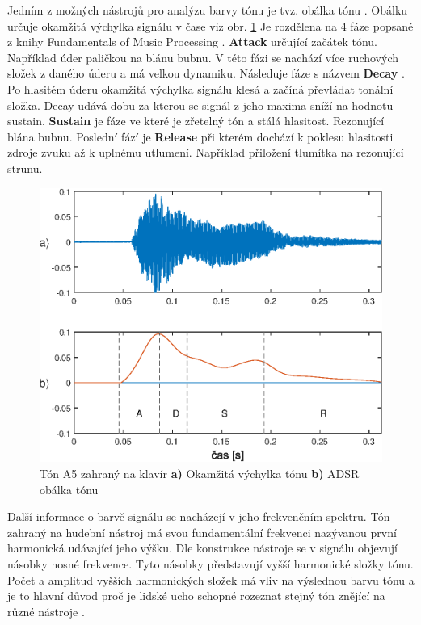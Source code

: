   Jedním z možných nástrojů pro analýzu barvy tónu je tvz. obálka tónu .
  Obálku určuje okamžitá výchylka signálu v čase viz obr. \ref{fig:ADSR_envelope_on_piano_tone}
  Je rozdělena na 4 fáze popsané z knihy Fundamentals of Music Processing \cite{fundamental_of_music_processing}.
  \textbf{Attack } určující začátek tónu. Například úder paličkou na blánu bubnu.
  V této fázi se nachází více ruchových složek z daného úderu a má velkou dynamiku.
  Následuje fáze s názvem \textbf{Decay }.
  Po hlasitém úderu okamžitá výchylka signálu klesá a začíná převládat tonální složka. Decay udává dobu za kterou se signál z jeho maxima sníží na hodnotu sustain.
  \textbf{Sustain } je fáze ve které je zřetelný tón a stálá hlasitost. Rezonující blána bubnu.
  Poslední fází je \textbf{Release } při kterém dochází k poklesu hlasitosti zdroje zvuku až k uplnému utlumení.
  Například přiložení tlumítka na rezonující strunu.

  \begin{figure}[H]
    \centering
    \includegraphics[width = 0.8\linewidth]{obrazky/ADSR.eps}
    \caption{Tón A5 zahraný na klavír \textbf{a)} Okamžitá výchylka tónu \textbf{b)} ADSR obálka tónu}
    \label{fig:ADSR_envelope_on_piano_tone}
  \end{figure}

  Další informace o barvě signálu se nacházejí v jeho frekvenčním spektru. 
  Tón zahraný na hudební nástroj má svou fundamentální  frekvenci nazývanou první harmonická udávající jeho výšku.
  Dle konstrukce nástroje se v signálu objevují násobky nosné frekvence.
  Tyto násobky představují vyšší harmonické složky tónu.
  Počet a amplitud vyšších harmonických složek má vliv na výslednou barvu tónu a je to hlavní důvod proč je lidské ucho schopné rozeznat stejný tón znějící na různé nástroje \cite{Musical_timbre_perception}.

